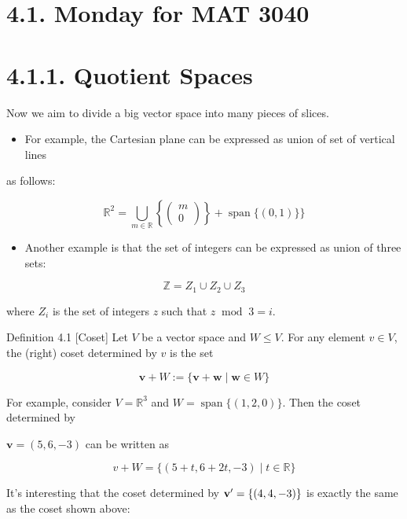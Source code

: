 \documentclass[11pt]{article}
\begin{document}
\section*{4.1. Monday for MAT 3040}

\section*{4.1.1. Quotient Spaces}

Now we aim to divide a big vector space into many pieces of slices.

\begin{itemize}
\item For example, the Cartesian plane can be expressed as union of set of vertical lines
\end{itemize}

as follows:

\[
{\mathbb{R}}^2 = \mathop{\bigcup }\limits_{{m \in  \mathbb{R}}}\left\{  \left( \begin{array}{l} m \\  0 \end{array}\right) \right\}   + \operatorname{span}\{ \left( {0,1}\right) \} \}
\]

\begin{itemize}
\item Another example is that the set of integers can be expressed as union of three sets:
\end{itemize}

\[
\mathbb{Z} = {Z}_1 \cup  {Z}_2 \cup  {Z}_{3}
\]

where \({Z}_{i}\) is the set of integers \(z\) such that \(z{\;\operatorname{mod}\;3} = i\).

Definition 4.1 [Coset] Let \(V\) be a vector space and \(W \leq  V\). For any element \(v \in  V\), the (right) coset determined by \(v\) is the set

\[
\mathbf{v} + W \mathrel{\text{ := }} \{ \mathbf{v} + \mathbf{w} \mid  \mathbf{w} \in  W\}
\]

For example, consider \(V = {\mathbb{R}}^{3}\) and \(W = \operatorname{span}\{ \left( {1,2,0}\right) \}\). Then the coset determined by

\(\mathbf{v} = \left( {5,6, - 3}\right)\) can be written as

\[
v + W = \{ \left( {5 + t,6 + {2t}, - 3}\right)  \mid  t \in  \mathbb{R}\}
\]

It’s interesting that the coset determined by \({\bf v}^{\prime } = \{ \left( {4,4, - 3}\right) \}\) is exactly the same as the coset shown above:
\end{document}
